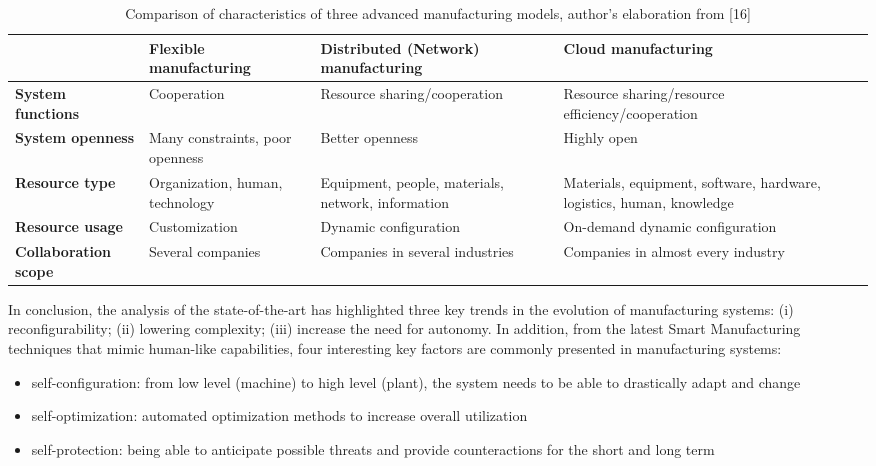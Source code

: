 \begin{table}
    \centering
    \begin{tabular}{|p{2cm}|p{2cm}|p{3cm}|p{3cm}|}
        \hline
         & \textbf{Flexible manufacturing} & \textbf{Distributed (Network) manufacturing} & \textbf{Cloud manufacturing}\\
         \hline
         \textbf{System functions} & Cooperation & Resource sharing/cooperation  & Resource sharing/resource efficiency/cooperation \\
         \hline
         \textbf{System openness} & Many constraints, poor openness & Better openness & Highly open \\
         \hline
         \textbf{Resource type} & Organization, human, technology & Equipment, people, materials, network, information & Materials, equipment, software, hardware, logistics, human, knowledge \\
         \hline
         \textbf{Resource usage} & Customization & Dynamic configuration & On-demand dynamic configuration \\
         \hline
         \textbf{Collaboration scope} & Several companies & Companies in several industries & Companies in almost every industry \\
        \hline
    \end{tabular}
    \caption{Comparison of characteristics of three advanced manufacturing models, author’s elaboration from [16]}
    \label{tab:comp-adv-mfg-models}
\end{table}

In conclusion, the analysis of the state-of-the-art has highlighted three key trends in the evolution of manufacturing systems: (i) reconfigurability; (ii) lowering complexity; (iii) increase the need for autonomy. In addition, from the latest Smart Manufacturing techniques that mimic human-like capabilities, four interesting key factors are commonly presented in manufacturing systems:
\begin{itemize}
    \item self-configuration: from low level (machine) to high level (plant), the system needs to be able to drastically adapt and change
    \item self-optimization: automated optimization methods to increase overall utilization
    \item self-protection: being able to anticipate possible threats and provide counteractions for the short and long term
\end{itemize}

